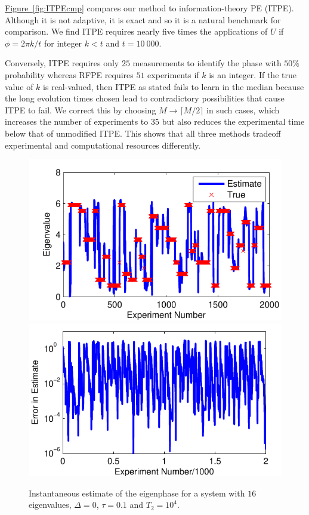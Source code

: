 \documentclass[aps,pra,amsmath,twocolumn,amssymb,superscriptaddress]{revtex4-1}
\newcommand{\fig}[1]{\hyperref[fig:#1]{Figure~\ref*{fig:#1}}}
\begin{document}
\fig{ITPEcmp} compares our method to information-theory PE (ITPE).  Although it is not adaptive, it is exact and so it is a natural benchmark for comparison.  We find ITPE requires nearly five times the applications of $U$ if $\phi=2\pi k/t$ for integer $k<t$ and $t=10~000$.  

Conversely, ITPE requires only $25$ measurements to identify the phase with $50\%$
probability whereas RFPE requires $51$ experiments if $k$ is an integer.  If
the true value of $k$ is real-valued, then ITPE as stated
fails to learn in the median because the long evolution times chosen lead to
contradictory possibilities that cause ITPE to fail.  We correct
this by choosing $M\rightarrow \lceil M/2\rceil$ in such cases, which increases the number
of experiments to $35$ but also reduces the experimental time below that of
unmodified ITPE.  This shows that all three methods
tradeoff experimental and computational resources differently.

\begin{figure}
    \begin{centering}
        \includegraphics[width=0.4\linewidth]{Errtrack1.pdf}
        \hspace{5mm}
        \includegraphics[width=0.4\linewidth]{Errtrack2.pdf}
    \end{centering}
    \caption{\label{fig:Errplot}
        Instantaneous estimate of the eigenphase  for a system with $16$ eigenvalues, $\Delta=0$, $\tau=0.1$ and $T_2=10^4$.
    }
\end{figure}

\end{document}
